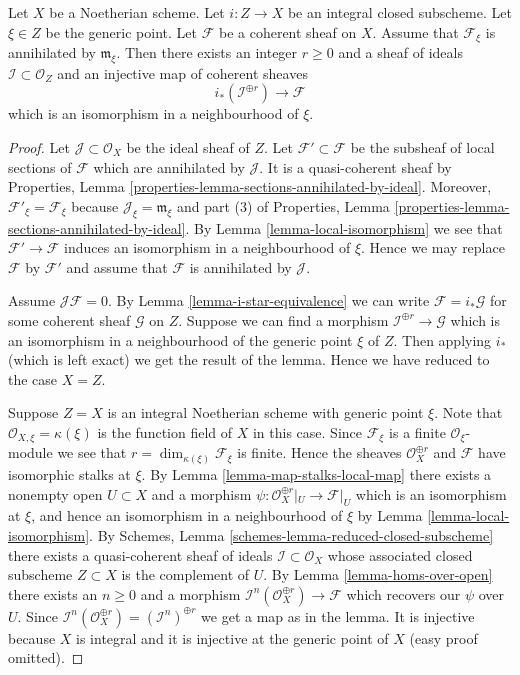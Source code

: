 \begin{lemma}
\label{lemma-prepare-filter-irreducible}
Let $X$ be a Noetherian scheme.
Let $i : Z \to X$ be an integral closed subscheme.
Let $\xi \in Z$ be the generic point.
Let $\mathcal{F}$ be a coherent sheaf on $X$.
Assume that $\mathcal{F}_\xi$ is annihilated by
$\mathfrak m_\xi$. Then there exists an integer
$r \geq 0$ and a sheaf of ideals $\mathcal{I} \subset \mathcal{O}_Z$
and an injective map of coherent sheaves
$$
i_*\left(\mathcal{I}^{\oplus r}\right) \to \mathcal{F}
$$
which is an isomorphism in a neighbourhood of $\xi$.
\end{lemma}

\begin{proof}
Let $\mathcal{J} \subset \mathcal{O}_X$ be the ideal sheaf of $Z$.
Let $\mathcal{F}' \subset \mathcal{F}$ be the subsheaf of
local sections of $\mathcal{F}$ which are annihilated by
$\mathcal{J}$. It is a quasi-coherent sheaf by
Properties, Lemma \ref{properties-lemma-sections-annihilated-by-ideal}.
Moreover, $\mathcal{F}'_\xi = \mathcal{F}_\xi$ because
$\mathcal{J}_\xi = \mathfrak m_\xi$ and part (3) of
Properties, Lemma \ref{properties-lemma-sections-annihilated-by-ideal}.
By Lemma \ref{lemma-local-isomorphism} we see that
$\mathcal{F}' \to \mathcal{F}$
induces an isomorphism in a neighbourhood of $\xi$.
Hence we may replace $\mathcal{F}$ by $\mathcal{F}'$ and assume
that $\mathcal{F}$ is annihilated by $\mathcal{J}$.

\medskip\noindent
Assume $\mathcal{J}\mathcal{F} = 0$. By
Lemma \ref{lemma-i-star-equivalence} we can write
$\mathcal{F} = i_*\mathcal{G}$ for some coherent
sheaf $\mathcal{G}$ on $Z$. Suppose we can find a morphism
$\mathcal{I}^{\oplus r} \to \mathcal{G}$ which is an isomorphism
in a neighbourhood of the generic point $\xi$ of $Z$.
Then applying $i_*$ (which is left exact) we get the result of the lemma.
Hence we have reduced to the case $X = Z$.

\medskip\noindent
Suppose $Z = X$ is an integral Noetherian scheme with generic point $\xi$.
Note that $\mathcal{O}_{X, \xi} = \kappa(\xi)$ is the function field of $X$
in this case.
Since $\mathcal{F}_\xi$ is a finite $\mathcal{O}_\xi$-module we see
that $r = \dim_{\kappa(\xi)} \mathcal{F}_\xi$ is finite.
Hence the sheaves $\mathcal{O}_X^{\oplus r}$ and $\mathcal{F}$
have isomorphic stalks at $\xi$.
By Lemma \ref{lemma-map-stalks-local-map} there exists a nonempty
open $U \subset X$ and a morphism
$\psi : \mathcal{O}_X^{\oplus r}|_U \to \mathcal{F}|_U$
which is an isomorphism
at $\xi$, and hence an isomorphism in a neighbourhood of $\xi$ by
Lemma \ref{lemma-local-isomorphism}.
By Schemes, Lemma \ref{schemes-lemma-reduced-closed-subscheme}
there exists a quasi-coherent sheaf of ideals
$\mathcal{I} \subset \mathcal{O}_X$
whose associated closed subscheme $Z \subset X$ is the complement
of $U$.
By Lemma \ref{lemma-homs-over-open} there exists an $n \geq 0$ and a morphism
$\mathcal{I}^n(\mathcal{O}_X^{\oplus r}) \to \mathcal{F}$
which recovers our $\psi$ over $U$. Since
$\mathcal{I}^n(\mathcal{O}_X^{\oplus r}) = (\mathcal{I}^n)^{\oplus r}$
we get a map as in the lemma. It is injective because $X$ is
integral and it is injective at the generic point of $X$
(easy proof omitted).
\end{proof}


